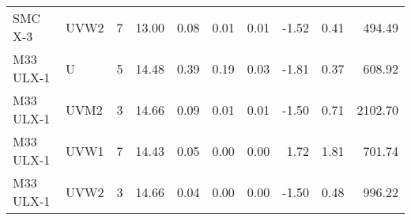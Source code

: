 \begin{tabular}{llrrrrrrrr}
           SMC X-3 &   UVW2 &      7 & 13.00 & 0.08 &      0.01 &   0.01 &     -1.52 &  0.41 &       494.49 \\
         M33 ULX-1 &      U &      5 & 14.48 & 0.39 &      0.19 &   0.03 &     -1.81 &  0.37 &       608.92 \\
         M33 ULX-1 &   UVM2 &      3 & 14.66 & 0.09 &      0.01 &   0.01 &     -1.50 &  0.71 &      2102.70 \\
         M33 ULX-1 &   UVW1 &      7 & 14.43 & 0.05 &      0.00 &   0.00 &      1.72 &  1.81 &       701.74 \\
         M33 ULX-1 &   UVW2 &      3 & 14.66 & 0.04 &      0.00 &   0.00 &     -1.50 &  0.48 &       996.22 \\
\bottomrule
\end{tabular}

